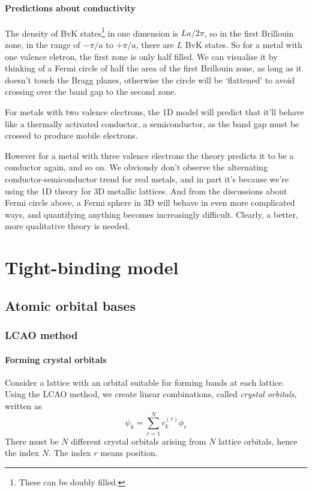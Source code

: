 \paragraph{Predictions about conductivity}
The density of BvK states\footnote{These can be doubly filled.} in one dimension is $La/2\pi$, so in the first Brillouin zone, in the range of $-\pi/a$ to $+\pi/a$, there are $L$ BvK states. So for a metal with one valence eletron, the first zone is only half filled. We can visualise it by thinking of a Fermi circle of half the area of the first Brillouin zone, as long as it doesn't touch the Bragg planes, otherwise the circle will be `flattened' to avoid crossing over the band gap to the second zone.\par
For metals with two valence electrons, the 1D model will predict that it'll behave like a thermally activated conductor, \ie a semiconductor, as the band gap must be crossed to produce mobile electrons.\par
However for a metal with three valence electrons the theory predicts it to be a conductor again, and so on. We obviously don't observe the alternating conductor-semiconductor trend for real metals, and in part it's because we're using the 1D theory for 3D metallic lattices. And from the discussions about Fermi circle above, a Fermi sphere in 3D will behave in even more complicated ways, and quantifying anything becomes increasingly difficult. Clearly, a better, more qualitative theory is needed.
\section{Tight-binding model}
\subsection{Atomic orbital bases}
\subsubsection{LCAO method}
\paragraph{Forming crystal orbitals}
Consider a lattice with an orbital suitable for forming bands at each lattice. Using the LCAO method, we create linear combinations, called \emph{crystal orbitals}, written as
\begin{equation}
	\psi_k=\sum_{r=1}^{N}c_k^{(r)}\phi_r
\end{equation}
There must be $N$ different crystal orbitals arising from $N$ lattice orbitals, hence the index $N$. The index $r$ means position.
